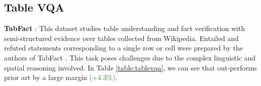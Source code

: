 \documentclass[10pt,twocolumn,letterpaper]{article}
\begin{document}
\subsection{Table VQA}

\textbf{TabFact} \cite{Chen2019TabFactAL, Borchmann2021DUE}: This dataset studies table understanding and fact verification with semi-structured evidence over 
tables collected from Wikipedia. Entailed and refuted statements corresponding to a single row or cell were prepared by the authors of TabFact \cite{Chen2019TabFactAL}. This task poses challenges due to the complex linguistic and spatial reasoning involved. In Table \ref{table:tablevqa}, we can see that \papertitle out-performs prior art by a large margin \textcolor{forestgreen}{(+4.3\%)}.

\begin{table}[htbp]
\centering
{}
\caption{\textbf{Comparison on Table VQA Datasets}\cite{Borchmann2021DUE}: Our work, \papertitle outperforms the previous state of the art. 
}
\label{table:tablevqa}
\vspace{-0.4cm}
\end{table}
\end{document}
